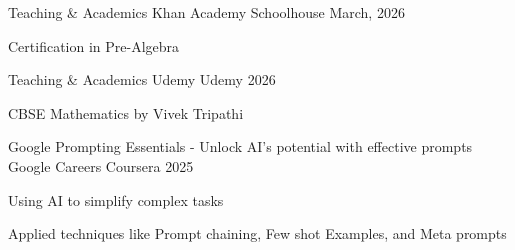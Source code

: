

\begin{cventries}


  \cventry
    {Teaching \& Academics}
    {Khan Academy}
    {Schoolhouse}
    {March, 2026}
    {
      \begin{cvitems}
        \item{Certification in Pre-Algebra}
      \end{cvitems}
    }
  
  \cventry
    {Teaching \& Academics}
    {Udemy}
    {Udemy}
    {2026}
    {
      \begin{cvitems}
        \item{CBSE Mathematics by Vivek Tripathi}
      \end{cvitems}
    }

  \cventry
    {Google Prompting Essentials - Unlock AI’s potential with effective prompts}
    {Google Careers}
    {Coursera}
    {2025}
    {
      \begin{cvitems}
        \item{Using AI to simplify complex tasks}
        \item{Applied techniques like Prompt chaining, Few shot Examples, and Meta prompts}
      \end{cvitems}
    }
  

\end{cventries}
